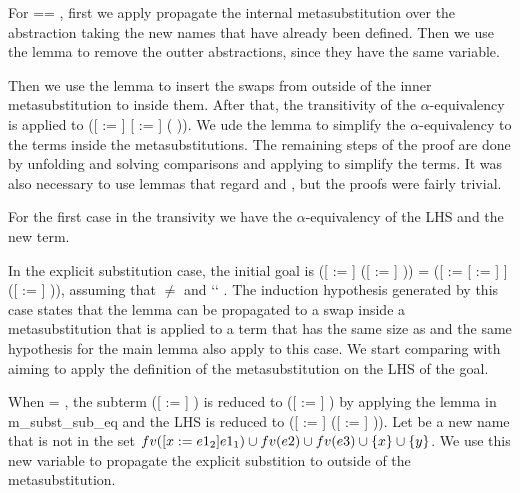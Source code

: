 For  == , first we apply  propagate the internal metasubstitution over the abstraction taking the new names that have already been defined. Then we use the lemma  to remove the outter abstractions, since they have the same variable. 
\begin{coqdoccode}
\end{coqdoccode}
Then we use the lemma  to insert the swaps from outside of the inner metasubstitution to inside them. After that, the transitivity of the $\alpha$-equivalency is applied to ([ := ] [ := ] (   )). We ude the lemma  to simplify the $\alpha$-equivalency to the terms inside the metasubstitutions. The remaining steps of the proof are done by unfolding and solving  comparisons and applying  to simplify the terms. It was also necessary to use lemmas that regard  and , but the proofs were fairly trivial.
\begin{coqdoccode}
\end{coqdoccode}
For the first case in the transivity we have the $\alpha$-equivalency of the LHS and the new term. 
\begin{coqdoccode}
\end{coqdoccode}
In the explicit substitution case, the initial goal is ([ := ] ([ := ]    )) = ([ := [ := ] ] ([ := ]    )), assuming that  \ensuremath{\not=}  and  ``  . The induction hypothesis generated by this case states that the lemma can be propagated to a swap inside a metasubstitution that is applied to a term that has the same size as  and the same hypothesis for the main lemma also apply to this case. We start comparing  with  aiming to apply the definition of the metasubstitution on the LHS of the goal.
\begin{coqdoccode}
\end{coqdoccode}
When  = , the subterm ([ := ]    ) is reduced to    ([ := ] ) by applying the lemma in m\_subst\_sub\_eq and the LHS is reduced to ([ := ]    ([ := ] )). Let  be a new name that is not in the set $fv(\esub{e1_1}{x}{e1_2}) \cup fv(e2) \cup fv(e3) \cup \{x\} \cup \{y\}$. We use this new variable to propagate the explicit substition to outside of the metasubstitution. 
